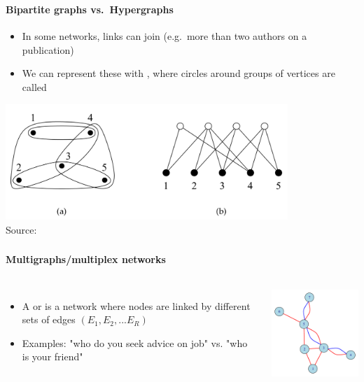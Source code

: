 \documentclass[8pt]{beamer}
\begin{document}

\begin{frame}
\frametitle{\insertsection}
\framesubtitle{Bipartite graphs vs.\ Hypergraphs}

\begin{itemize}
	\item In some networks, links can join {\color{blue}{more than two vertices}} (e.g.\ more than two authors on a publication)
	\item We can represent these with {\color{blue}{hypergraphs}}, where circles around groups of vertices are called {\color{blue}{hyperedges}}
\end{itemize}


\centering
\includegraphics[width = 0.8\textwidth]{hyper}\\
\tiny{Source: \cite{Newman2010}}

\end{frame}


\begin{frame}
\frametitle{\insertsection}
\framesubtitle{Multigraphs/multiplex networks} 

\begin{columns}[c]
\begin{itemize}
	\item A {\color{blue}{multigraph}} or {\color{blue}{multiplex network}} is a network where nodes are linked by different sets of edges $(E_1, E_2, ... E_R)$
	\item Examples: "who do you seek advice on job" vs. "who is your friend"
\end{itemize}

\centering
\includegraphics[width=5cm]{multiplex}

\end{columns}

\end{frame}
\end{document}
